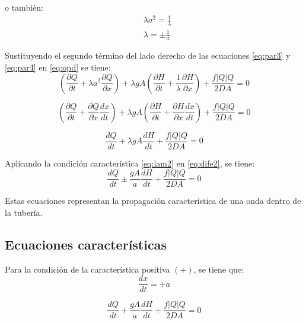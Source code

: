 \documentclass[letterpaper]{report}
\begin{document}
o también:
\begin{equation}
	\begin{aligned}
		&\lambda a^2 =\frac{1}{\lambda}\\
		&\lambda =\pm\frac{1}{a}
	\end{aligned}
\label{eq:lam2}
\end{equation}

Sustituyendo el segundo término del lado derecho de las ecuaciones \ref{eq:par3} y \ref{eq:par4} en \ref{eq:opd} se tiene:
\begin{equation*}
	\left(\frac{\partial Q}{\partial t}+\lambda a^2\frac{\partial Q}{\partial x}\right)+\lambda gA\left(\frac{\partial H}{\partial t}+\frac{1}{\lambda}\frac{\partial H}{\partial x}\right)+\frac{f\left|Q\right|Q}{2DA}=0
\end{equation*}

\begin{equation*}
	\left(\frac{\partial Q}{\partial t}+\frac{\partial Q}{\partial x}\frac{dx}{dt}\right)+\lambda gA\left(\frac{\partial H}{\partial t}+\frac{\partial H}{\partial x}\frac{dx}{dt}\right)+\frac{f\left|Q\right|Q}{2DA}=0
\end{equation*}

\begin{equation}
	\frac{dQ}{dt}+\lambda gA\frac{dH}{dt}+\frac{f\left|Q\right|Q}{2DA}=0
\label{eq:dife2}
\end{equation}

Aplicando la condición característica \ref{eq:lam2} en \ref{eq:dife2}, se tiene:
\begin{equation}
	\frac{dQ}{dt}\pm\frac{gA}{a}\frac{dH}{dt}+\frac{f\left|Q\right|Q}{2DA}=0
\end{equation}

Estas ecuaciones representan la propagación característica de una onda dentro de la tubería.

\subsection{Ecuaciones características}
Para la condición de la característica positiva $(+)$, se tiene que:
\begin{equation}
	\frac{dx}{dt}=+a
\label{eq:pos1}
\end{equation}

\begin{equation}
	\frac{dQ}{dt}+\frac{gA}{a}\frac{dH}{dt}+\frac{f\left|Q\right|Q}{2DA}=0
\label{eq:pos2}
\end{equation}
\end{document}
